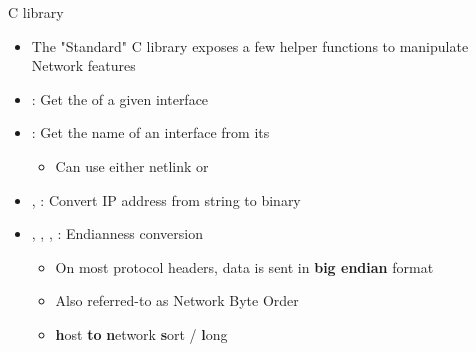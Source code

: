 \begin{frame}{C library}
	\begin{itemize}
		\item The "Standard" C library exposes a few helper functions to manipulate Network features
		\item {}: Get the  of a given interface
		\item {}: Get the name of an interface from its 
			\begin{itemize}
				\item Can use either netlink or 
			\end{itemize}
		\item {}, : Convert IP address from string to binary
		\item {}, , , : Endianness conversion
			\begin{itemize}
				\item On most protocol headers, data is sent in \textbf{big endian} format
				\item Also referred-to as Network Byte Order
				\item \textbf{h}ost \textbf{to} \textbf{n}etwork \textbf{s}ort / \textbf{l}ong
			\end{itemize}
	\end{itemize}
\end{frame}




